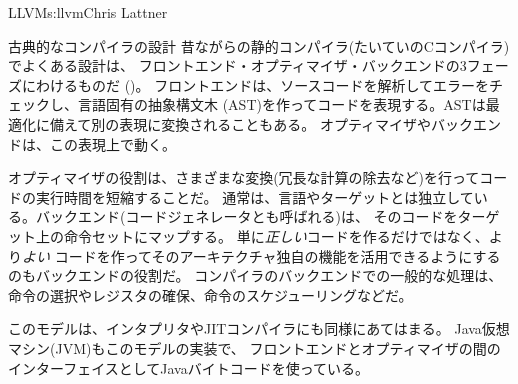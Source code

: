 \begin{aosachapter}{LLVM}{s:llvm}{Chris Lattner}
\begin{aosasect1}{古典的なコンパイラの設計}
昔ながらの静的コンパイラ(たいていのCコンパイラ)でよくある設計は、
フロントエンド・オプティマイザ・バックエンドの3フェーズにわけるものだ
()。
フロントエンドは、ソースコードを解析してエラーをチェックし、言語固有の抽象構文木
(AST)を作ってコードを表現する。ASTは最適化に備えて別の表現に変換されることもある。
オプティマイザやバックエンドは、この表現上で動く。


オプティマイザの役割は、さまざまな変換(冗長な計算の除去など)を行ってコードの実行時間を短縮することだ。
通常は、言語やターゲットとは独立している。バックエンド(コードジェネレータとも呼ばれる)は、
そのコードをターゲット上の命令セットにマップする。
単に\emph{正しい}コードを作るだけではなく、より\emph{よい}
コードを作ってそのアーキテクチャ独自の機能を活用できるようにするのもバックエンドの役割だ。
コンパイラのバックエンドでの一般的な処理は、
命令の選択やレジスタの確保、命令のスケジューリングなどだ。

このモデルは、インタプリタやJITコンパイラにも同様にあてはまる。
Java仮想マシン(JVM)もこのモデルの実装で、
フロントエンドとオプティマイザの間のインターフェイスとしてJavaバイトコードを使っている。


\end{aosasect1}
\end{aosachapter}
